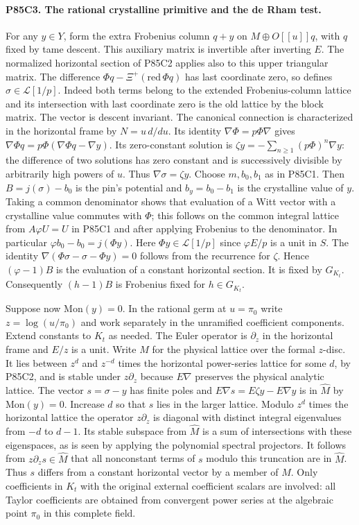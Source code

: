 \paragraph{P85C3. The rational crystalline primitive and the de Rham test.}
For any $y\in Y$, form the extra Frobenius column $q+y$ on
$M\oplus O[[u]]q$, with $q$ fixed by tame descent. This auxiliary
matrix is invertible after inverting $E$. The normalized horizontal
section of P85C2 applies also to this upper triangular matrix.
The difference $\Phi q-\Xi^+(\mathrm{red}\,\Phi q)$ has last
coordinate zero, so defines $\sigma\in\mathcal L[1/p]$.
Indeed both terms belong to the extended Frobenius-column lattice
and its intersection with last coordinate zero is the old lattice
by the block matrix. The vector is descent invariant. The canonical
connection is characterized in the horizontal frame by
$N=u\,d/du$. Its identity $\nabla\Phi=p\Phi\nabla$ gives
$\nabla\Phi q=p\Phi(\nabla\Phi q-\nabla y)$. Its zero-constant
solution is $\zeta y=-\sum_{n\ge1}(p\Phi)^n\nabla y$:
the difference of two solutions has zero constant and is successively
divisible by arbitrarily high powers of $u$. Thus
$\nabla\sigma=\zeta y$. Choose $m,b_0,b_1$ as in P85C1. Then
$B=j(\sigma)-b_0$ is the pin's potential and $b_y=b_0-b_1$ is the
crystalline value of $y$. Taking a common denominator shows that
evaluation of a Witt vector with a crystalline value commutes with
$\Phi$; this follows on the common integral lattice from
$A\varphi U=U$ in P85C1 and after applying Frobenius to the
denominator. In particular $\varphi b_0-b_0=j(\Phi y)$.
Here $\Phi y\in\mathcal L[1/p]$ since $\varphi E/p$ is a unit in
$S$. The identity $\nabla(\Phi\sigma-\sigma-\Phi y)=0$
follows from the recurrence for $\zeta$. Hence
$(\varphi-1)B$ is the evaluation of a constant horizontal
section. It is fixed by $G_{K_t}$. Consequently $(h-1)B$ is
Frobenius fixed for $h\in G_{K_t}$.

Suppose now $\mathrm{Mon}(y)=0$. In the rational germ at
$u=\pi_0$ write $z=\log(u/\pi_0)$ and work separately in the
unramified coefficient components. Extend constants to $K_t$ as
needed. The Euler operator is $\partial_z$ in the horizontal
frame and $E/z$ is a unit. Write $\widehat M$ for the physical
lattice over the formal $z$-disc. It lies between
$z^d$ and $z^{-d}$ times the horizontal power-series lattice
for some $d$, by P85C2, and is stable under $z\partial_z$
because $E\nabla$ preserves the physical analytic lattice.
The vector $s=\sigma-y$ has finite poles and
$E\nabla s=E\zeta y-E\nabla y$ is in $\widehat M$ by
$\mathrm{Mon}(y)=0$. Increase $d$ so that $s$ lies in the
larger lattice. Modulo $z^d$ times the horizontal lattice the
operator $z\partial_z$ is diagonal with distinct integral
eigenvalues from $-d$ to $d-1$. Its stable subspace from
$\widehat M$ is a sum of intersections with these eigenspaces,
as is seen by applying the polynomial spectral projectors.
It follows from $z\partial_z s\in\widehat M$ that all nonconstant
terms of $s$ modulo this truncation are in $\widehat M$.
Thus $s$ differs from a constant horizontal vector by a member
of $\widehat M$. Only coefficients in $K_t$ with the original
external coefficient scalars are involved: all Taylor coefficients
are obtained from convergent power series at the algebraic point
$\pi_0$ in this complete field.

